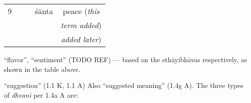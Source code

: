 \documentclass[10pt]{article}
\begin{document}
\begin{multicols}{2}
\begin{tabular}{|c||c|c||c|c|}
		\hline
		9 &                  &                  & śānta         & peace (\textit{this}  \\
		  &                  &                  &               & \textit{term added})  \\
		  &                  &                  &               & \textit{added later}) \\
		\hline
	\end{tabular}


	\begin{enumerate}
		 ``flavor'', ``sentiment'' (TODO REF) --- based on the sthāyibhāvas respectively, as shown in the table above.




		 ``suggestion'' (1.1 K, 1.1 A) Also ``suggested meaning'' (1.4g A). The three types of \textit{dhvani} per 1.4a A are:
		\begin{enumerate}


\end{enumerate}
\end{enumerate}
\end{multicols}
\end{document}
